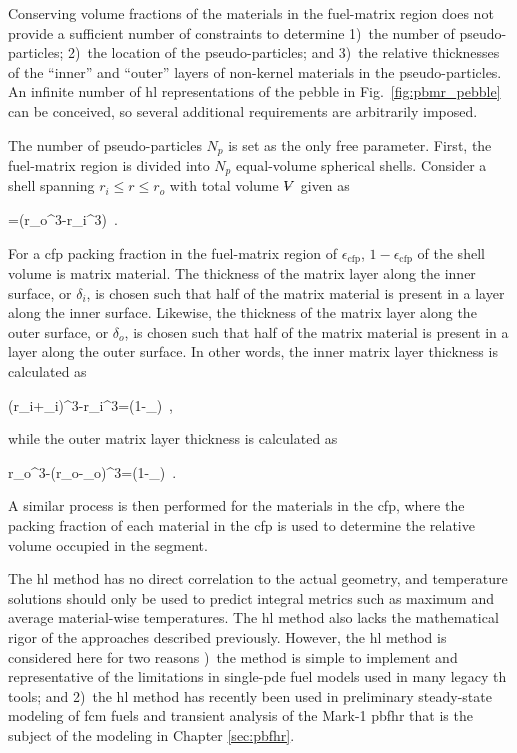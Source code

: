 Conserving volume fractions of the materials in the fuel-matrix region does not provide a sufficient number of constraints to determine 1)~the number of pseudo-particles; 2)~the location of the pseudo-particles; and 3)~the relative thicknesses of the ``inner'' and ``outer'' layers of non-kernel materials in the pseudo-particles. An infinite number of \gls{hl} representations of the pebble in Fig.\ \ref{fig:pbmr_pebble} can be conceived, so several additional requirements are arbitrarily imposed. 

The number of pseudo-particles \(N_p\) is set as the only free parameter. First, the fuel-matrix region is divided into \(N_p\) equal-volume spherical shells. Consider a shell spanning \(r_i\leq r\leq r_o\) with total volume \(\volume\) given as

\beq
\volume=\pi\left(r_o^3-r_i^3\right)\ .
\eeq

\noindent For a \gls{cfp} packing fraction in the fuel-matrix region of \(\epsilon_\text{cfp}\), \(1-\epsilon_\text{cfp}\) of the shell volume is matrix material. The thickness of the matrix layer along the inner surface, or \(\delta_i\), is chosen such that half of the matrix material is present in a layer along the inner surface. Likewise, the thickness of the matrix layer along the outer surface, or \(\delta_o\), is chosen such that half of the matrix material is present in a layer along the outer surface. In other words, the inner matrix layer thickness is calculated as

\beq
{}\pi\left\lbrack\left(r_i+\delta_i\right)^3-r_i^3\right\rbrack=\left(1-\epsilon_\right)\volume\ ,
\eeq

\noindent while the outer matrix layer thickness is calculated as

\beq
{}\pi\left\lbrack r_o^3-\left(r_o-\delta_o\right)^3\right\rbrack=\left(1-\epsilon_\right)\volume\ .
\eeq

\noindent A similar process is then performed for the materials in the \gls{cfp}, where the packing fraction of each material in the \gls{cfp} is used to determine the relative volume occupied in the segment.

The \gls{hl} method has no direct correlation to the actual geometry, and temperature solutions should only be used to predict integral metrics such as maximum and average material-wise temperatures. The \gls{hl} method also lacks the mathematical rigor of the approaches described previously. However, the \gls{hl} method is considered here for two reasons )~the method is simple to implement and representative of the limitations in single-\gls{pde} fuel models used in many legacy \gls{th} tools; and 2)~the \gls{hl} method has recently been used in preliminary steady-state modeling of \gls{fcm} fuels \cite{brown_fcm} and transient analysis of the Mark-1 \gls{pbfhr} \cite{xin_wang_thesis} that is the subject of the modeling in Chapter \ref{sec:pbfhr}.

